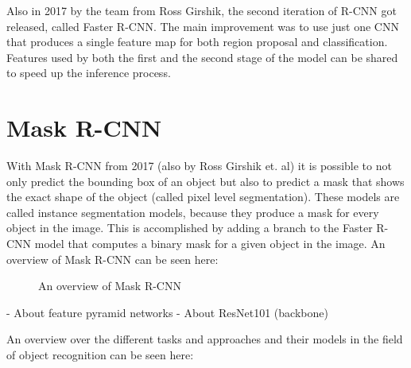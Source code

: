 Also in 2017 by the team from Ross Girshik, the second iteration of R-CNN got released, called Faster R-CNN. The main improvement was to use just one CNN that produces a single feature map for both region proposal and classification. Features used by both the first and the second stage of the model can be shared to speed up the inference process.

\section{Mask R-CNN}

With Mask R-CNN from 2017 (also by Ross Girshik et. al) it is possible to not only predict the bounding box of an object but also to predict a mask that shows the exact shape of the object (called pixel level segmentation). These models are called instance segmentation models, because they produce a mask for every object in the image. This is accomplished by adding a branch to the Faster R-CNN model that computes a binary mask for a given object in the image. An overview of Mask R-CNN can be seen here:

\begin{figure}[H]
	\caption{\label{fig:maskrcnn2} An overview of Mask R-CNN}
\end{figure}

- About feature pyramid networks
- About ResNet101 (backbone)

An overview over the different tasks and approaches and their models  in the field of object recognition can be seen here:

